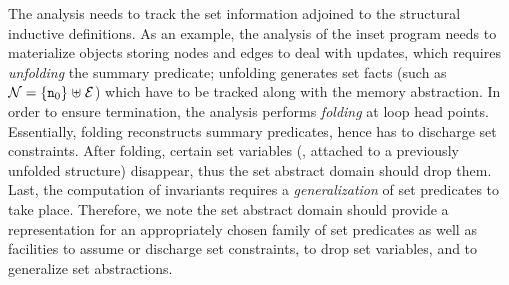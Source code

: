 \begin{wrapfigure}{r}{0.335\textwidth}
  \vspace{-8mm}
\end{wrapfigure}
The analysis needs to track the set information adjoined to the
structural inductive definitions.
As an example, the analysis of the inset program needs to materialize
objects storing nodes and edges to deal with updates, which requires
{\em unfolding} the summary predicate;
unfolding generates set facts (such as \( \mathcal{N} = \{ \texttt{n}_{0} \} \mathrel{\uplus}
\mathcal{E} \)) which have to be tracked along with the memory abstraction.
In order to ensure termination, the analysis performs {\em folding} at
loop head points.
Essentially, folding reconstructs summary predicates, hence has to
discharge set constraints.
After folding, certain set variables (\eg, attached to a previously
unfolded structure) disappear, thus the set abstract domain should
drop them.
Last, the computation of invariants requires a {\em generalization}
of set predicates to take place.
Therefore, we note the set abstract domain should provide a
representation for an appropriately chosen family of set predicates
as well as facilities to assume or discharge set constraints, to
drop set variables, and to generalize set abstractions.

